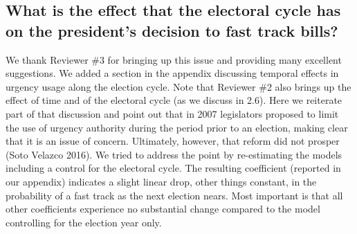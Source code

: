 \documentclass[article,letterpaper,times,12pt,listings-bw,microtype]{article}
\begin{document}
\subsection{What is the effect that the electoral cycle has on the president's decision to fast track bills?}
We thank Reviewer \#3 for bringing up this issue and providing many excellent suggestions. We added a section in the appendix discussing temporal effects in urgency usage along the election cycle. Note that Reviewer \#2 also brings up the effect of time and of the electoral cycle (as we discuss in 2.6). Here we reiterate part of that discussion and point out that in 2007 legislators proposed to limit the use of urgency authority during the period prior to an election, making clear that it is an issue of concern. Ultimately, however, that reform did not prosper (Soto Velazco 2016). We tried to address the point by re-estimating the models including a control for the electoral cycle. The resulting coefficient (reported in our appendix) indicates a slight linear drop, other things constant, in the probability of a fast track as the next election nears. Most important is that all other coefficients experience no substantial change compared to the model controlling for the election year only.

\end{document}
